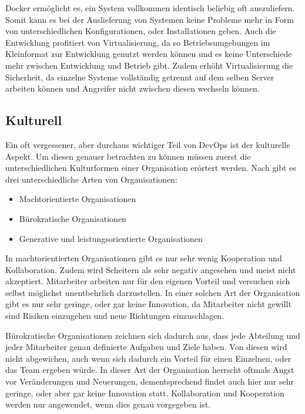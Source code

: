 Docker ermöglicht es, ein System vollkommen identisch beliebig oft auszuliefern. 
Somit kann es bei der Auslieferung von Systemen keine Probleme mehr in Form von unterschiedlichen Konfigurationen, oder Installationen geben. 
Auch die Entwicklung profitiert von Virtualisierung, da so Betriebsumgebungen im Kleinformat zur Entwicklung genutzt werden können und es keine Unterschiede mehr zwischen Entwicklung und Betrieb gibt.
Zudem erhöht Virtualisierung die Sicherheit, da einzelne Systeme vollständig getrennt auf dem selben Server arbeiten können und Angreifer nicht zwischen diesen wechseln können. 
\parencite[Vgl.][S. 1 - 22]{matthias:2015}

\subsection{Kulturell}
Ein oft vergessener, aber durchaus wichtiger Teil von DevOps ist der kulturelle Aspekt. 
Um diesen genauer betrachten zu können müssen zuerst die unterschiedlichen Kulturformen einer Organisation erörtert werden.
Nach \parencite[vgl.][S. 2]{westrum:2004} gibt es drei unterschiedliche Arten von Organisationen:

\begin{itemize}
\item Machtorientierte Organisationen
\item Bürokratische Organisationen
\item Generative und leistungsorientierte Organisationen
\end{itemize}

In machtorientierten Organisationen gibt es nur sehr wenig Kooperation und Kollaboration.
Zudem wird Scheitern als sehr negativ angesehen und meist nicht akzeptiert. Mitarbeiter arbeiten nur für den eigenen Vorteil und versuchen sich selbst möglichst unentbehrlich darzustellen. 
In einer solchen Art der Organisation gibt es nur sehr geringe, oder gar keine Innovation, da Mitarbeiter nicht gewillt sind Risiken einzugehen und neue Richtungen einzuschlagen. \parencite[vgl.][S. 2]{westrum:2004}

Bürokratische Organisationen zeichnen sich dadurch aus, dass jede Abteilung und jeder Mitarbeiter genau definierte Aufgaben und Ziele haben. 
Von diesen wird nicht abgewichen, auch wenn sich dadurch ein Vorteil für einen Einzelnen, oder das Team ergeben würde. 
In dieser Art der Organisation herrscht oftmals Angst vor Veränderungen und Neuerungen, dementsprechend findet auch hier nur sehr geringe, oder aber gar keine Innovation statt. Kollaboration und Kooperation werden nur angewendet, wenn dies genau vorgegeben ist. \parencite[vgl.][S. 2]{westrum:2004}

